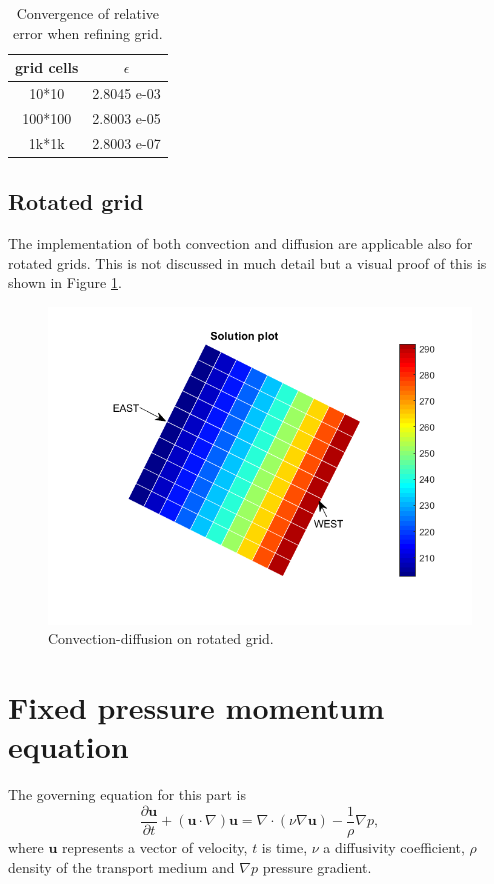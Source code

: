 \documentclass[]{article}
\begin{document}
\begin{table}
	\centering
	\begin{tabular}{|c|c|}
		\hline
		grid cells & $ \epsilon $ \\
		\hline
		10*10 &2.8045 e-03  \\
		\hline
		100*100 &  2.8003 e-05  \\
		\hline
		1k*1k & 2.8003 e-07 \\
		\hline
	\end{tabular}
	\caption{Convergence of relative error when refining grid.}
	\label{tab:convection_diffusion_grid}
\end{table}

\subsection{Rotated grid}
The implementation of both convection and diffusion are applicable also for rotated grids. This is not discussed in much detail but a visual proof of this is shown in Figure \ref{fig:convectiondiffusionrotated}.
\begin{figure}
	\centering
	\includegraphics[width=0.8\linewidth]{figs/convection_diffusion_rotated}
	\caption{Convection-diffusion on rotated grid.}
	\label{fig:convectiondiffusionrotated}
\end{figure}




\section{Fixed pressure momentum equation}
The governing equation for this part is 
\begin{equation}\label{eq:pressure_momentum}
\dfrac{\partial \mathbf{u}}{\partial t} + (\mathbf{u} \cdot \nabla)\mathbf{u} = \nabla \cdot (\nu\nabla\mathbf{u}) - \dfrac{1}{\rho}\nabla p,
\end{equation}
where $ \mathbf{u} $ represents a vector of velocity, $ t $ is time, $ \nu $ a diffusivity coefficient, $ \rho $ density of the transport medium and $ \nabla p $ pressure gradient. 
\end{document}
